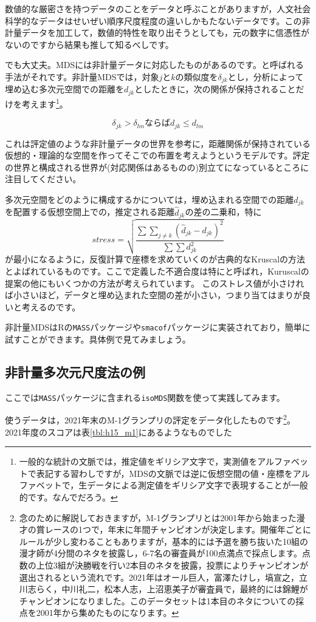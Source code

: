\documentclass{ltjsbook}
\begin{document}
数値的な厳密さを持つデータのことをデータと呼ぶことがありますが，人文社会科学的なデータはせいぜい順序尺度程度の違いしかもたないデータです。この非計量データを加工して，数値的特性を取り出そうとしても，元の数字に信憑性がないのですから結果も推して知るべしです。

でも大丈夫。MDSには非計量データに対応したものがあるのです。と呼ばれる手法がそれです。非計量MDSでは，対象$j$と$k$の類似度を$\delta_{jk}$とし，分析によって埋め込む多次元空間での距離を$d_{jk}$としたときに，次の関係が保持されることだけを考えます\footnote{一般的な統計の文脈では，推定値をギリシア文字で，実測値をアルファベットで表記する習わしですが，MDSの文脈では逆に仮想空間の値・座標をアルファベットで，生データによる測定値をギリシア文字で表現することが一般的です。なんでだろう。}。

$$ \delta_{jk} > \delta_{lm} \mbox{ならば}d_{jk}\le d_{lm} $$

これは評定値のような非計量データの世界を参考に，距離関係が保持されている仮想的・理論的な空間を作ってそこでの布置を考えようというモデルです。評定の世界と構成される世界が(対応関係はあるものの)別立てになっているところに注目してください。

多次元空間をどのように構成するかについては，埋め込まれる空間での距離$d_{jk}$を配置する仮想空間上での，推定される距離$\hat{d}_{jk}$の差の二乗和，特に
\[ stress = \sqrt{\frac{\sum \sum_{j\neq k}(\hat{d}_{jk}-d_{jk})^2}{\sum \sum d_{jk}^2}} \]
が最小になるように，反復計算で座標を求めていくのが古典的なKruscalの方法とよばれているものです\parencite{kruskal1964}。ここで定義した不適合度は特にと呼ばれ，Kuruscalの提案の他にもいくつかの方法が考えられています。
このストレス値が小さければ小さいほど，データと埋め込まれた空間の差が小さい，つまり当てはまりが良いと考えるのです。

非計量MDSはRの\verb|MASS|パッケージや\verb|smacof|パッケージに実装されており，簡単に試すことができます。具体例で見てみましょう。

\subsection{非計量多次元尺度法の例}

ここでは\verb|MASS|パッケージに含まれる\verb|isoMDS|関数を使って実践してみます。

使うデータは，2021年末のM-1グランプリの評定をデータ化したものです\footnote{念のために解説しておきますが，M-1グランプリとは2001年から始まった漫才の賞レースの1つで，年末に年間チャンピオンが決定します。開催年ごとにルールが少し変わることもありますが，基本的には予選を勝ち抜いた10組の漫才師が4分間のネタを披露し，6-7名の審査員が100点満点で採点します。点数の上位3組が決勝戦を行い2本目のネタを披露，投票によりチャンピオンが選出されるという流れです。2021年はオール巨人，富澤たけし，塙宣之，立川志らく，中川礼二，松本人志，上沼恵美子が審査員で，最終的には錦鯉がチャンピオンになりました。このデータセットは1本目のネタについての採点を2001年から集めたものになります。}。2021年度のスコアは表\ref{tbl:h15_m1}にあるようなものでした
\end{document}
